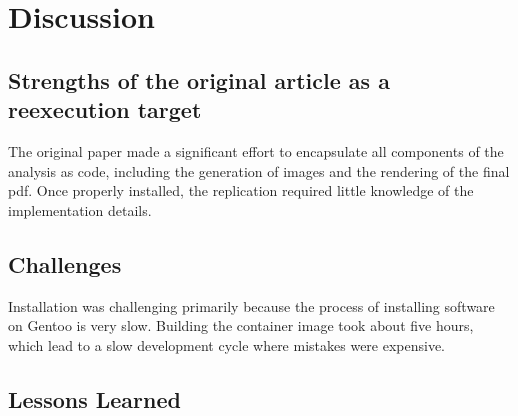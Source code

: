 \section{Discussion}

\subsection{Strengths of the original article as a reexecution target}
The original paper made a significant effort to encapsulate all
components of the analysis as code, including the generation of images
and the rendering of the final pdf. Once properly installed, the
replication required little knowledge of the implementation details.

\subsection{Challenges}
Installation was challenging primarily because the process of installing
software on Gentoo is very slow. Building the container image took
about five hours, which lead to a slow development cycle where mistakes
were expensive.




\subsection{Lessons Learned}

